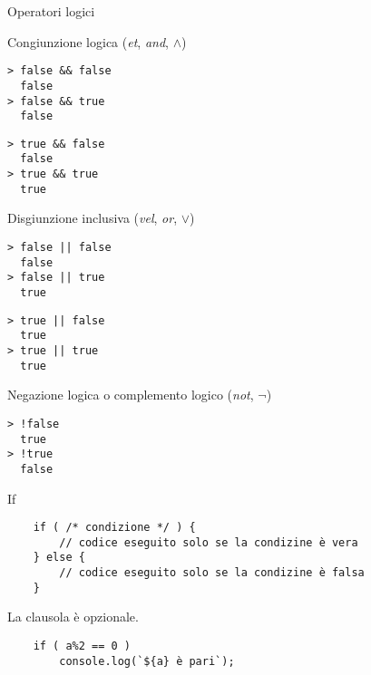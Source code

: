 \begin{frame}[fragile]{Operatori logici}\transfade\centering
  \begin{description}[<+->]
    \item[\mintjs{&&}] Congiunzione logica (\emph{et}, \emph{and}, $\land$)\\\smallskip
\begin{minipage}{.3\linewidth}
\begin{verbatim}
> false && false
  false
> false && true
  false
\end{verbatim}
\end{minipage}
\begin{minipage}{.3\linewidth}
\begin{verbatim}
> true && false
  false
> true && true
  true
\end{verbatim}
\end{minipage}\smallskip
    \item[\mintjs{||}] Disgiunzione inclusiva (\emph{vel}, \emph{or}, $\lor$)\\\smallskip
\begin{minipage}{.3\linewidth}
\begin{verbatim}
> false || false
  false
> false || true
  true
\end{verbatim}
\end{minipage}
\begin{minipage}{.3\linewidth}
\begin{verbatim}
> true || false
  true
> true || true
  true
\end{verbatim}
\end{minipage}\smallskip
    \item[\mintjs{!}] Negazione logica o complemento logico (\emph{not}, $\lnot$)\smallskip
\begin{verbatim}
> !false
  true
> !true
  false
\end{verbatim}
  \end{description}
\end{frame}

\begin{frame}[fragile]{If}\transfade\centering
  \begin{verbatim}
    if ( /* condizione */ ) {
        // codice eseguito solo se la condizine è vera
    } else {
        // codice eseguito solo se la condizine è falsa
    }
  \end{verbatim}
  \pause\bigskip
  La clausola  è opzionale.
  \begin{verbatim}
    if ( a%2 == 0 )
        console.log(`${a} è pari`);
  \end{verbatim}
\end{frame}

